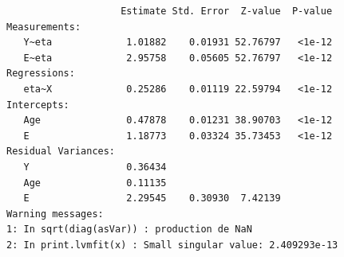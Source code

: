 \documentclass[12pt]{article}
\begin{document}
\begin{verbatim}
                    Estimate Std. Error  Z-value  P-value
Measurements:                                            
   Y~eta             1.01882    0.01931 52.76797   <1e-12
   E~eta             2.95758    0.05605 52.76797   <1e-12
Regressions:                                             
   eta~X             0.25286    0.01119 22.59794   <1e-12
Intercepts:                                              
   Age               0.47878    0.01231 38.90703   <1e-12
   E                 1.18773    0.03324 35.73453   <1e-12
Residual Variances:                                      
   Y                 0.36434                             
   Age               0.11135                             
   E                 2.29545    0.30930  7.42139         
Warning messages:
1: In sqrt(diag(asVar)) : production de NaN
2: In print.lvmfit(x) : Small singular value: 2.409293e-13
\end{verbatim}
\end{document}
